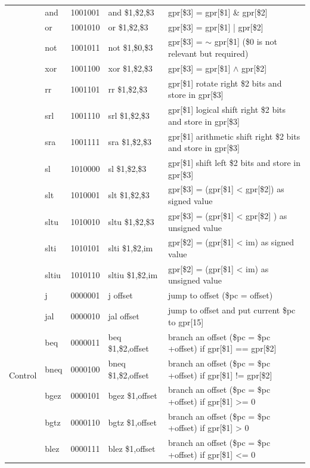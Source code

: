 \documentclass{sig-alternate}
\begin{document}
\begin{table}
\begin{tabular}{|c|l|c|l|p{8cm}|}
 & and & 1001001 & and \$1,\$2,\$3 & gpr[\$3] = gpr[\$1] \& gpr[\$2] \\ \cline{2-5}  
 & or & 1001010 & or \$1,\$2,\$3 & gpr[\$3] = gpr[\$1] | gpr[\$2] \\ \cline{2-5}
 & not & 1001011 & not \$1,\$0,\$3 & gpr[\$3] = $\sim$ gpr[\$1]  (\$0 is not relevant but required) \\ \cline{2-5}
 & xor & 1001100 & xor \$1,\$2,\$3 & gpr[\$3] = gpr[\$1] $\wedge$ gpr[\$2] \\ \cline{2-5}
 & rr & 1001101 & rr \$1,\$2,\$3 &  gpr[\$1] rotate right \$2 bits and store in gpr[\$3] \\ \cline{2-5}
 & srl & 1001110 & srl \$1,\$2,\$3 & gpr[\$1] logical shift right \$2 bits and store in gpr[\$3]  \\ \cline{2-5}  
 & sra & 1001111 & sra \$1,\$2,\$3 & gpr[\$1] arithmetic shift right \$2 bits and store in gpr[\$3]  \\ \cline{2-5}
 & sl & 1010000 & sl \$1,\$2,\$3 & gpr[\$1] shift left \$2 bits and store in gpr[\$3]  \\ \cline{2-5}
 & slt & 1010001 & slt \$1,\$2,\$3 & gpr[\$3] = (gpr[\$1] < gpr[\$2]) as signed value \\ \cline{2-5}
 & sltu & 1010010 & sltu \$1,\$2,\$3 &  gpr[\$3] = (gpr[\$1] < gpr[\$2] ) as unsigned value \\ \cline{2-5}
 & slti &1010101 & slti \$1,\$2,im & gpr[\$2] = (gpr[\$1] < im) as signed value \\ \cline{2-5}
 & sltiu & 1010110 & sltiu \$1,\$2,im &  gpr[\$2] = (gpr[\$1] < im) as unsigned value\\ \hline
\multirow{9}{*}{Control} & j & 0000001 & j offset & jump to offset (\$pc = offset) \\ \cline{2-5}
 & jal & 0000010 & jal offset & jump to offset and put current \$pc to gpr[15] \\ \cline{2-5}  
 & beq & 0000011 & beq \$1,\$2,offset & branch an offset (\$pc = \$pc +offset) if gpr[\$1] == gpr[\$2] \\ \cline{2-5}
 & bneq & 0000100 & bneq \$1,\$2,offset & branch an offset (\$pc = \$pc +offset) if gpr[\$1] != gpr[\$2] \\ \cline{2-5}
 & bgez & 0000101 & bgez \$1,offset & branch an offset (\$pc = \$pc +offset) if gpr[\$1] >= 0 \\ \cline{2-5}
 & bgtz & 0000110 & bgtz \$1,offset & branch an offset (\$pc = \$pc +offset) if gpr[\$1] > 0 \\ \cline{2-5}
 & blez & 0000111 & blez \$1,offset &  branch an offset (\$pc = \$pc +offset) if gpr[\$1] <= 0 \\ \cline{2-5}  

\end{tabular}
\end{table}
\end{document}
